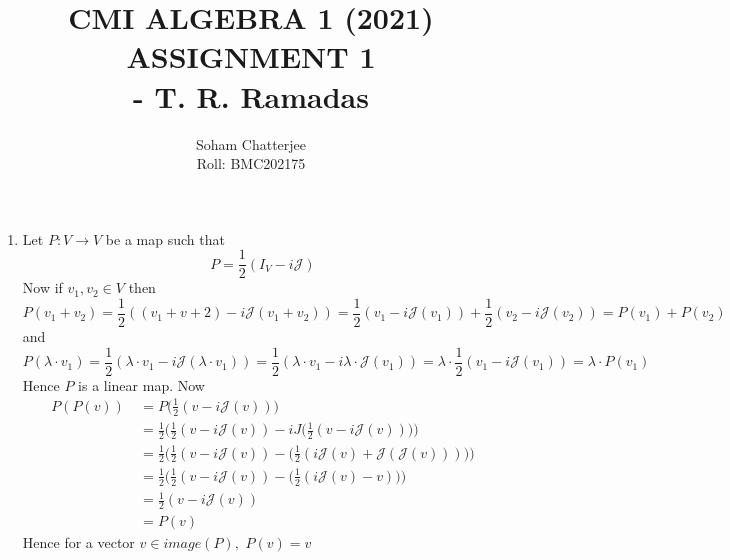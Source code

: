 \documentclass{article}
\title{\huge{CMI ALGEBRA 1 (2021) ASSIGNMENT 1\\\hspace{7cm}- T. R. Ramadas}
}
\author{Soham Chatterjee\\Roll: BMC202175}
\date{}
\newcommand{\mJ}{\mathcal{J}}
\begin{document}
\maketitle\pagebreak
\begin{enumerate}
	\item Let $P:V\to V$ be a map such that $$P=\frac{1}{2}(I_V-i\mJ)$$Now if $v_1,v_2\in V$ then $$P(v_1+v_2)=\frac{1}{2}((v_1+v+2)-i\mJ(v_1+v_2))=\frac{1}{2}(v_1-i\mJ(v_1))+\frac{1}{2}(v_2-i\mJ(v_2))=P(v_1)+P(v_2)$$and $$P(\lambda\cdot v_1)=\frac{1}{2}(\lambda\cdot v_1-i\mJ(\lambda\cdot v_1))=\frac{1}{2}(\lambda\cdot v_1-i\lambda\cdot \mJ(v_1))=\lambda\cdot \frac{1}{2}(v_1-i\mJ(v_1))=\lambda\cdot P(v_1)$$Hence $P$ is a linear map. Now \begin{align*}
		      P(P(v))\  & =P\bigg(\frac{1}{2}(v-i\mJ(v))\bigg)                                                        \\
		                & =\frac{1}{2}\Bigg(\frac{1}{2}(v-i\mJ(v))-iJ\bigg(\frac{1}{2}(v-i\mJ(v))\bigg)\Bigg)         \\
		                & =\frac{1}{2}\Bigg(\frac{1}{2}(v-i\mJ(v))-\bigg(\frac{1}{2}(i\mJ(v)+\mJ(\mJ(v)))\bigg)\Bigg) \\
		                & =\frac{1}{2}\Bigg(\frac{1}{2}(v-i\mJ(v))-\bigg(\frac{1}{2}(i\mJ(v)-v)\bigg)\Bigg)           \\
		                & =\frac{1}{2}(v-i\mJ(v))                                                                     \\
		                & =P(v)
	      \end{align*}Hence for a vector $v\in image(P),$ $P(v)=v$


\end{enumerate}
\end{document}
